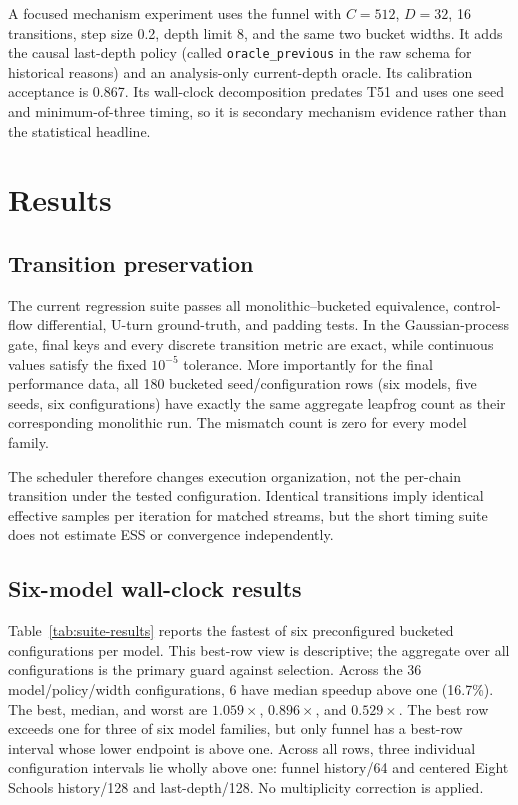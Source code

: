 \documentclass[conference]{IEEEtran}
\begin{document}
A focused mechanism experiment uses the funnel with $C=512$, $D=32$, 16
transitions, step size 0.2, depth limit 8, and the same two bucket widths.  It adds the causal last-depth policy (called \texttt{oracle\_previous} in the
raw schema for historical reasons) and an analysis-only current-depth oracle.
Its calibration acceptance is 0.867.  Its wall-clock decomposition predates T51
and uses one seed and minimum-of-three timing, so it is secondary mechanism
evidence rather than the statistical headline.

\section{Results}
\label{sec:results}

\subsection{Transition preservation}

The current regression suite passes all monolithic--bucketed equivalence,
control-flow differential, U-turn ground-truth, and padding tests.  In the
Gaussian-process gate, final keys and every discrete transition metric are
exact, while continuous values satisfy the fixed $10^{-5}$ tolerance.  More
importantly for the final performance data, all 180 bucketed seed/configuration
rows (six models, five seeds, six configurations) have exactly the same
aggregate leapfrog count as their corresponding monolithic run.  The mismatch
count is zero for every model family.

The scheduler therefore changes execution organization, not the per-chain
transition under the tested configuration.  Identical transitions imply
identical effective samples per iteration for matched streams, but the short
timing suite does not estimate ESS or convergence independently.

\subsection{Six-model wall-clock results}

Table~\ref{tab:suite-results} reports the fastest of six preconfigured
bucketed configurations per model.  This best-row view is descriptive; the
aggregate over all configurations is the primary guard against selection.
Across the 36 model/policy/width configurations, 6 have median speedup above one
(16.7\%).  The best, median, and worst are $1.059\times$, $0.896\times$, and
$0.529\times$.  The best row exceeds one for three of six model families, but
only funnel has a best-row interval whose lower endpoint is above one.  Across
all rows, three individual configuration intervals lie wholly above one: funnel
history/64 and centered Eight Schools history/128 and last-depth/128.  No
multiplicity correction is applied.
\end{document}
